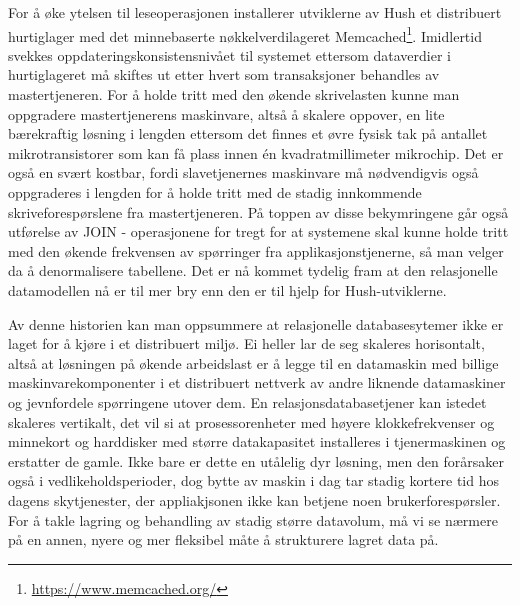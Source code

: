 For å øke ytelsen til leseoperasjonen installerer utviklerne av Hush et distribuert hurtiglager med det minnebaserte nøkkelverdilageret Memcached\footnote{\url{https://www.memcached.org/}}. Imidlertid svekkes oppdateringskonsistensnivået til systemet ettersom dataverdier i hurtiglageret må skiftes ut etter hvert som transaksjoner behandles av mastertjeneren. For å holde tritt med den økende skrivelasten kunne man oppgradere mastertjenerens maskinvare, altså å skalere oppover, en lite bærekraftig løsning i lengden ettersom det finnes et øvre fysisk tak på antallet mikrotransistorer som kan få plass innen én kvadratmillimeter mikrochip. Det er også en svært kostbar, fordi slavetjenernes maskinvare må nødvendigvis også oppgraderes i lengden for å holde tritt med de stadig innkommende skriveforespørslene fra mastertjeneren. På toppen av disse bekymringene går også utførelse av JOIN - operasjonene for tregt for at systemene skal kunne holde tritt med den økende frekvensen av spørringer fra applikasjonstjenerne, så man velger da å denormalisere tabellene. Det er nå kommet tydelig fram at den relasjonelle datamodellen nå er til mer bry enn den er til hjelp for Hush-utviklerne.

Av denne historien kan man oppsummere at relasjonelle databasesytemer ikke er laget for å kjøre i et distribuert miljø. Ei heller lar de seg skaleres horisontalt, altså at løsningen på økende arbeidslast er å legge til en datamaskin med billige maskinvarekomponenter i et distribuert nettverk av andre liknende datamaskiner og jevnfordele spørringene utover dem. En relasjonsdatabasetjener kan istedet skaleres vertikalt, det vil si at prosessorenheter med høyere klokkefrekvenser og minnekort og harddisker med større datakapasitet installeres i tjenermaskinen og erstatter de gamle. Ikke bare er dette en utålelig dyr løsning, men den forårsaker også i vedlikeholdsperioder, dog bytte av maskin i dag tar stadig kortere tid hos dagens skytjenester, der appliakjsonen ikke kan betjene noen brukerforespørsler. For å takle lagring og behandling av stadig større datavolum, må vi se nærmere på en annen, nyere og mer fleksibel måte å strukturere lagret data på. 

